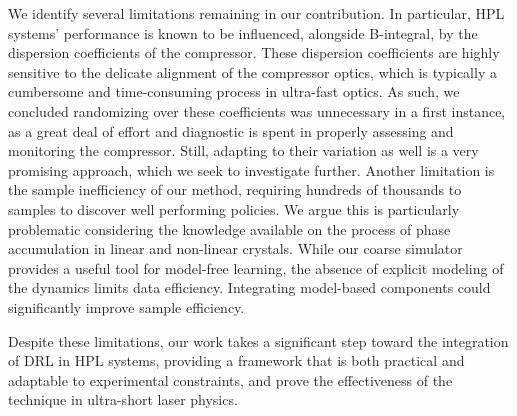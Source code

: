 

We identify several limitations remaining in our contribution. In particular, HPL systems' performance is known to be influenced, alongside B-integral, by the dispersion coefficients of the compressor. These dispersion coefficients are highly sensitive to the delicate alignment of the compressor optics, which is typically a cumbersome and time-consuming process in ultra-fast optics. As such, we concluded randomizing over these coefficients was unnecessary in a first instance, as a great deal of effort and diagnostic is spent in properly assessing and monitoring the compressor. Still, adapting to their variation as well is a very promising approach, which we seek to investigate further. \newline 
Another limitation is the sample inefficiency of our method, requiring hundreds of thousands to samples to discover well performing policies. We argue this is particularly problematic considering the knowledge available on the process of phase accumulation in linear and non-linear crystals. While our coarse simulator provides a useful tool for model-free learning, the absence of explicit modeling of the dynamics limits data efficiency. Integrating model-based components could significantly improve sample efficiency.

Despite these limitations, our work takes a significant step toward the integration of DRL in HPL systems, providing a framework that is both practical and adaptable to experimental constraints, and prove the effectiveness of the technique in ultra-short laser physics.